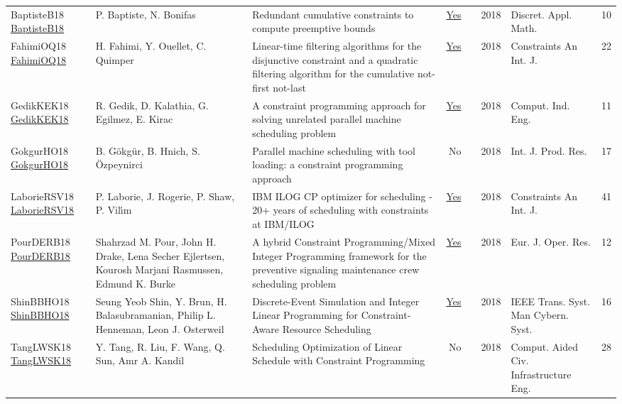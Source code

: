 {\begin{longtable}{p{3cm}p{6cm}p{7cm}rrrp{3cm}r}
BaptisteB18 \href{https://doi.org/10.1016/j.dam.2017.05.001}{BaptisteB18} & P. Baptiste, N. Bonifas & Redundant cumulative constraints to compute preemptive bounds & \href{articles/BaptisteB18.pdf}{Yes} & \cite{BaptisteB18} & 2018 & Discret. Appl. Math. & 10\\
FahimiOQ18 \href{https://doi.org/10.1007/s10601-018-9282-9}{FahimiOQ18} & H. Fahimi, Y. Ouellet, C. Quimper & Linear-time filtering algorithms for the disjunctive constraint and a quadratic filtering algorithm for the cumulative not-first not-last & \href{articles/FahimiOQ18.pdf}{Yes} & \cite{FahimiOQ18} & 2018 & Constraints An Int. J. & 22\\
GedikKEK18 \href{https://doi.org/10.1016/j.cie.2018.05.014}{GedikKEK18} & R. Gedik, D. Kalathia, G. Egilmez, E. Kirac & A constraint programming approach for solving unrelated parallel machine scheduling problem & \href{articles/GedikKEK18.pdf}{Yes} & \cite{GedikKEK18} & 2018 & Comput. Ind. Eng. & 11\\
GokgurHO18 \href{https://doi.org/10.1080/00207543.2017.1421781}{GokgurHO18} & B. G{\"{o}}kg{\"{u}}r, B. Hnich, S. {\"{O}}zpeynirci & Parallel machine scheduling with tool loading: a constraint programming approach & No & \cite{GokgurHO18} & 2018 & Int. J. Prod. Res. & 17\\
LaborieRSV18 \href{https://doi.org/10.1007/s10601-018-9281-x}{LaborieRSV18} & P. Laborie, J. Rogerie, P. Shaw, P. Vil{\'{\i}}m & {IBM} {ILOG} {CP} optimizer for scheduling - 20+ years of scheduling with constraints at {IBM/ILOG} & \href{articles/LaborieRSV18.pdf}{Yes} & \cite{LaborieRSV18} & 2018 & Constraints An Int. J. & 41\\
PourDERB18 \href{https://doi.org/10.1016/j.ejor.2017.08.033}{PourDERB18} & Shahrzad M. Pour, John H. Drake, Lena Secher Ejlertsen, Kourosh Marjani Rasmussen, Edmund K. Burke & A hybrid Constraint Programming/Mixed Integer Programming framework for the preventive signaling maintenance crew scheduling problem & \href{articles/PourDERB18.pdf}{Yes} & \cite{PourDERB18} & 2018 & Eur. J. Oper. Res. & 12\\
ShinBBHO18 \href{https://doi.org/10.1109/TSMC.2017.2681623}{ShinBBHO18} & Seung Yeob Shin, Y. Brun, H. Balasubramanian, Philip L. Henneman, Leon J. Osterweil & Discrete-Event Simulation and Integer Linear Programming for Constraint-Aware Resource Scheduling & \href{articles/ShinBBHO18.pdf}{Yes} & \cite{ShinBBHO18} & 2018 & {IEEE} Trans. Syst. Man Cybern. Syst. & 16\\
TangLWSK18 \href{https://doi.org/10.1111/mice.12277}{TangLWSK18} & Y. Tang, R. Liu, F. Wang, Q. Sun, Amr A. Kandil & Scheduling Optimization of Linear Schedule with Constraint Programming & No & \cite{TangLWSK18} & 2018 & Comput. Aided Civ. Infrastructure Eng. & 28\\

\end{longtable}}

